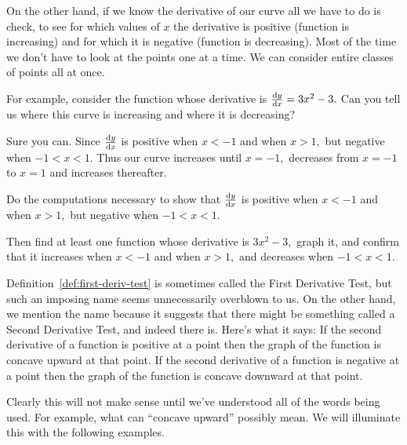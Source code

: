 On the other hand, if we know the derivative of our curve all we have
to do is check, to see for which values of $x$ the derivative is
positive (function is increasing) and for which it is negative
(function is decreasing). Most of the time we don't have to look at
the points one at a time. We can consider entire classes of points all
at once.  


\begin{myexample}
  For example, consider the function whose derivative is $\frac{\text{d}{y}}{\text{d}{x}}=
  3x^2-3.$ Can you tell us where this curve is increasing and where it
  is decreasing?
  
  Sure you can. Since $\frac{\text{d}{y}}{\text{d}{x}}$ is positive when $x<-1$ and when
  $x>1,$ but negative when $-1<x<1.$ Thus our curve increases until
  $x=-1,$ decreases from $x=-1$ to $x=1$ and increases thereafter.
  \begin{embeddedproblem}{}
    Do the computations necessary to show that $\frac{\text{d}{y}}{\text{d}{x}}$ is
    positive when $x<-1$ and when $x>1,$ but negative when $-1<x<1.$

    Then find at least one function whose derivative is $3x^2-3,$
    graph it, and confirm that it increases when $x<-1$ and when
    $x>1,$ and decreases when $-1<x<1.$
  \end{embeddedproblem}
\end{myexample}

Definition~\ref{def:first-deriv-test} is sometimes called the First
Derivative Test, but such an imposing name seems unnecessarily
overblown to us. On the other hand, we mention the name because it
suggests that there might be something called a Second Derivative
Test, and indeed there is. Here's what it says: If the second
derivative of a function is positive at a point then the graph of the
function is concave upward at that point. If the second
derivative of a function is negative at a point then the graph of the
function is concave downward at that point. 

Clearly this will not make sense until we've understood all of the
words being used. For example, what can ``concave upward'' possibly
mean. We will illuminate this with the following examples.

